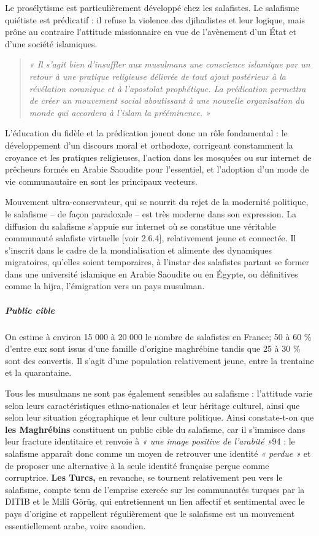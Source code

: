 Le prosélytisme est particulièrement développé chez les salafistes. Le
salafisme quiétiste est prédicatif : il refuse la violence des
djihadistes et leur logique, mais prône au contraire l'attitude
missionnaire en vue de l'avènement d'un État et d'une société
islamiques.
\begin{quote}
    \emph{« Il s'agit bien d'insuffler aux musulmans une conscience
islamique par un retour à une pratique religieuse délivrée de tout ajout
postérieur à la révélation coranique et à l'apostolat prophétique. La
prédication permettra de créer un mouvement social aboutissant à une
nouvelle organisation du monde qui accordera à l'islam la
prééminence}\emph{. »}
\end{quote}
 L'éducation du fidèle et la prédication jouent
donc un rôle fondamental : le développement d'un discours moral et
orthodoxe, corrigeant constamment la croyance et les pratiques
religieuses, l'action dans les mosquées ou sur internet de prêcheurs
formés en Arabie Saoudite pour l'essentiel, et l'adoption d'un mode de
vie communautaire en sont les principaux vecteurs.

Mouvement ultra-conservateur, qui se nourrit du rejet de la modernité
politique, le salafisme -- de façon paradoxale -- est très moderne dans
son expression. La diffusion du salafisme s'appuie sur internet où se
constitue une véritable communauté salafiste virtuelle {[}voir 2.6.4{]},
relativement jeune et connectée. Il s'inscrit dans le cadre de la
mondialisation et alimente des dynamiques migratoires, qu'elles soient
temporaires, à l'instar des salafistes partant se former dans une
université islamique en Arabie Saoudite ou en Égypte, ou définitives
comme la hijra, l'émigration vers un pays musulman.



\subparagraph{Public cible}


On estime à environ 15 000 à 20 000 le nombre de salafistes en France;
50 à 60 \% d'entre eux sont issus d'une famille d'origine maghrébine
tandis que 25 à 30 \% sont des convertis. Il s'agit d'une population
relativement jeune, entre la trentaine et la quarantaine.

Tous les musulmans ne sont pas également sensibles au salafisme :
l'attitude varie selon leurs caractéristiques ethno-nationales et leur
héritage culturel, ainsi que selon leur situation géographique et leur
culture politique. Ainsi constate-t-on que \textbf{les Maghrébins}
constituent un public cible du salafisme, car il s'immisce dans leur
fracture
identitaire et renvoie à \emph{« une image positive de l'arabité »}94 :
le salafisme apparaît donc comme un moyen de retrouver une identité
\emph{« perdue »} et de proposer une alternative à la seule identité
française perçue comme corruptrice. \textbf{Les Turcs,} en revanche, se
tournent relativement peu vers le salafisme, compte tenu de l'emprise
exercée sur les communautés turques par la DITIB et le Millî Görüş, qui
entretiennent un lien affectif et sentimental avec le pays d'origine et
rappellent régulièrement que le salafisme est un mouvement
essentiellement arabe, voire saoudien.

